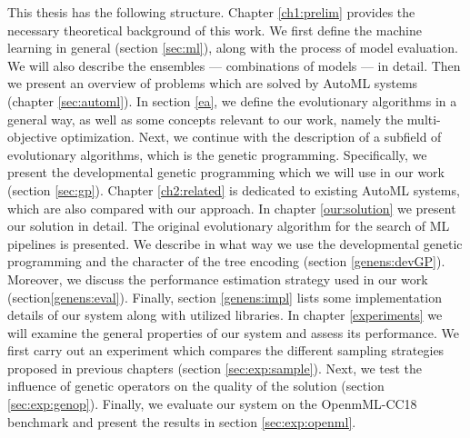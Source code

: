 This thesis has the following structure. Chapter \ref{ch1:prelim} provides the
necessary theoretical background of this work. We first define the machine
learning in general (section \ref{sec:ml}), along with the process of model
evaluation. We will also describe the ensembles --- combinations of models
--- in detail. Then we present an overview of problems which are solved by
AutoML systems (chapter \ref{sec:automl}). In section \ref{ea}, we define the
evolutionary algorithms in a general way, as well as some concepts relevant
to our work, namely the multi-objective optimization. Next, we continue with
the description of a subfield of evolutionary algorithms, which is the genetic programming.
Specifically, we present the developmental genetic programming which we will
use in our work (section \ref{sec:gp}). 
Chapter \ref{ch2:related} is dedicated to existing AutoML systems, which are
also compared with our approach.
In chapter \ref{our:solution} we present our solution in detail.
The original evolutionary algorithm for the search of ML pipelines is presented.
We describe in what way we use the developmental genetic programming and the character of
the tree encoding (section \ref{genens:devGP}). Moreover, we discuss the
performance estimation strategy used in our work (section\ref{genens:eval}).
Finally, section \ref{genens:impl} lists some implementation details of our
system along with utilized libraries.
In chapter \ref{experiments} we will examine the general properties of our
system and assess its performance. We first carry out an experiment which
compares the different sampling strategies proposed in previous chapters
(section \ref{sec:exp:sample}). Next, we test the influence of genetic
operators on the quality of the solution (section \ref{sec:exp:genop}).
Finally, we evaluate our system on the OpenmML-CC18 benchmark and present the
results in section \ref{sec:exp:openml}.